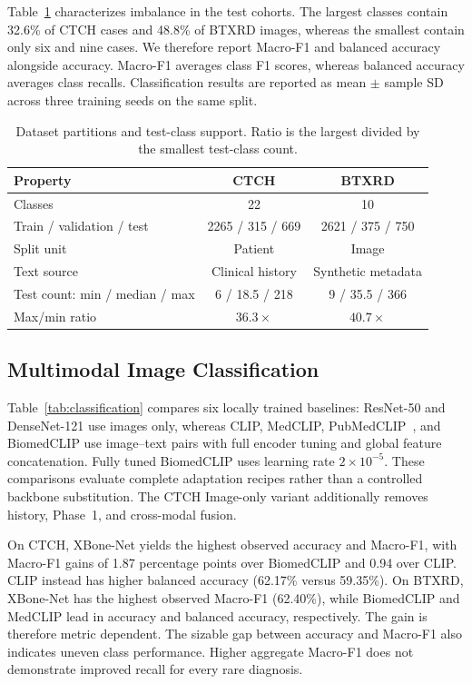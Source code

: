 \documentclass[conference,a4paper]{IEEEtran}
\begin{document}
Table~\ref{tab:datasets} characterizes imbalance in the test cohorts. The largest classes contain 32.6\% of CTCH cases and 48.8\% of BTXRD images, whereas the smallest contain only six and nine cases. We therefore report Macro-F1 and balanced accuracy alongside accuracy. Macro-F1 averages class F1 scores, whereas balanced accuracy averages class recalls. Classification results are reported as mean $\pm$ sample SD across three training seeds on the same split.

\begin{table}[t]
\caption{Dataset partitions and test-class support. Ratio is the largest divided by the smallest test-class count.}
\label{tab:datasets}
\centering\footnotesize
\begin{tabular}{@{}lcc@{}}
\toprule
Property & CTCH & BTXRD \\
\midrule
Classes & 22 & 10 \\
Train / validation / test & 2265 / 315 / 669 & 2621 / 375 / 750 \\
Split unit & Patient & Image \\
Text source & Clinical history & Synthetic metadata \\
Test count: min / median / max & 6 / 18.5 / 218 & 9 / 35.5 / 366 \\
Max/min ratio & $36.3\times$ & $40.7\times$ \\
\bottomrule
\end{tabular}
\end{table}

\subsection{Multimodal Image Classification}
Table~\ref{tab:classification} compares six locally trained baselines: ResNet-50 and DenseNet-121 use images only, whereas CLIP, MedCLIP, PubMedCLIP~\cite{PubMedCLIP}, and BiomedCLIP use image--text pairs with full encoder tuning and global feature concatenation. Fully tuned BiomedCLIP uses learning rate $2\times10^{-5}$. These comparisons evaluate complete adaptation recipes rather than a controlled backbone substitution. The CTCH Image-only variant additionally removes history, Phase~1, and cross-modal fusion.



On CTCH, XBone-Net yields the highest observed accuracy and Macro-F1, with Macro-F1 gains of 1.87 percentage points over BiomedCLIP and 0.94 over CLIP. CLIP instead has higher balanced accuracy (62.17\% versus 59.35\%). On BTXRD, XBone-Net has the highest observed Macro-F1 (62.40\%), while BiomedCLIP and MedCLIP lead in accuracy and balanced accuracy, respectively. The gain is therefore metric dependent. The sizable gap between accuracy and Macro-F1 also indicates uneven class performance. Higher aggregate Macro-F1 does not demonstrate improved recall for every rare diagnosis.
\end{document}

